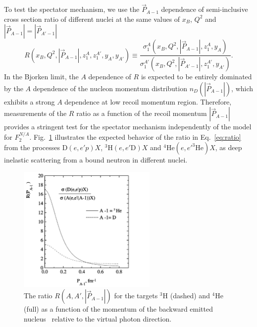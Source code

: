 To test the spectator mechanism, we use the $\vec P_{A-1}$ dependence of semi-inclusive cross section ratio of different nuclei at the same values of $x_B$, $Q^2$ and $|\vec P_{A-1}| = |\vec P_{A'-1}|$
\begin{equation}
R(x_B,Q^2,|\vec P_{A-1}|,z_1^A,z_1^{A'},y_A,y_{A'})\equiv \frac{\sigma_1^A(x_B,Q^2,|\vec P_{A-1}|,z_1^A,y_A)}{\sigma_1^{A'}(x_B,Q^2,|\vec P_{A'-1}|,z_1^{A'},y_{A'})}.
\label{eq:ratio}
\end{equation}
In the Bjorken limit, the $A$ dependence of $R$ is expected to be entirely dominated by the $A$ dependence of the nucleon momentum distribution $n_D(|\vec P_{A-1}|)$, which exhibits a strong $A$ dependence at low recoil momentum region. Therefore, measurements of the $R$ ratio as a function of the recoil momentum $|\vec P_{A-1}|$ provides a stringent test for the spectator mechanism independently of the model for $F_2^{N/A}$. Fig.~\ref{fig:ratio_spec} illustrates the expected behavior of the ratio in Eq.~\ref{eq:ratio} from the processes D$(e, e' p)X$, $^3$H$(e, e' \mathrm{D})X$ and $^4$He$(e, e'^3 \mathrm{He})X$, as deep inelastic scattering from a bound neutron in different nuclei.

\begin{figure}
  \begin{center}
    \includegraphics[angle=0, width=0.6\textwidth]{./fig-chap1/ratio_spec}
    \caption{The ratio $R(A,A',|\vec P_{A-1}|)$ for the targets $^3$H (dashed) and $^4$He (full) as a function of the momentum of the backward emitted nucleus~\cite{CiofidegliAtti1999} relative to the virtual photon direction.}
    \label{fig:ratio_spec}
  \end{center}
\end{figure}

